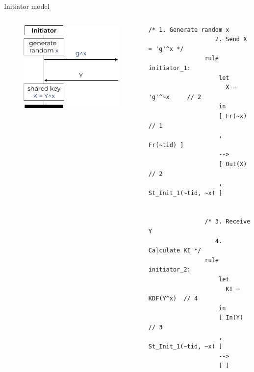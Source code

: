 \documentclass[11pt,aspectratio=169]{beamer}
\begin{document}
\begin{frame}[fragile]{Initiator model}
    \begin{columns}
        \begin{column}{0.5\textwidth}
            \begin{figure}
                \includegraphics[width=\textwidth]{./figures/lecture_2/dh_i}
            \end{figure}
        \end{column}
        \begin{column}{0.5\textwidth}
            \begin{lstlisting}[style=tamarin, gobble=16]
                /* 1. Generate random x
                   2. Send X = 'g'^x */
                rule initiator_1:
                    let
                      X = 'g'^~x     // 2
                    in
                    [ Fr(~x)         // 1
                    , Fr(~tid) ]
                    -->
                    [ Out(X)         // 2
                    , St_Init_1(~tid, ~x) ]


                /* 3. Receive Y
                   4. Calculate KI */
                rule initiator_2:
                    let
                      KI = KDF(Y^x)  // 4
                    in
                    [ In(Y)          // 3
                    , St_Init_1(~tid, ~x) ]
                    -->
                    [ ]
            \end{lstlisting}
        \end{column}
    \end{columns}
    \vsep
\end{frame}
\end{document}
